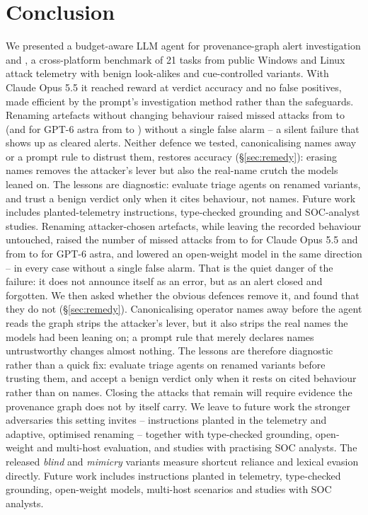 \section{Conclusion}
\label{sec:conclusion}

We presented a budget-aware LLM agent for provenance-graph alert investigation and \bench, a cross-platform
benchmark of 21 tasks from public Windows and Linux attack telemetry with benign look-alikes and cue-controlled
variants.
\ifnum{}
With Claude Opus 5.5 it reached reward \ResFullReward{} at \ResFullAccuracy{} verdict accuracy and no false
positives, made efficient by the prompt's investigation method rather than the safeguards.
\fi
\ifnum{}
\ifconf
Renaming artefacts without changing behaviour raised missed attacks from \ResCueBaseMissed{} to
\ResMimicryMissed{} (and for GPT-6 astra from \McGptBaseMissed{} to \McGptMimicryMissed{}) without a single false
alarm -- a silent failure that shows up as cleared alerts. Neither defence we tested, canonicalising names away or
a prompt rule to distrust them, restores accuracy (\S\ref{sec:remedy}): erasing names removes the attacker's lever
but also the real-name crutch the models leaned on. The lessons are diagnostic: evaluate triage agents on renamed
variants, and trust a benign verdict only when it cites behaviour, not names. Future work includes
planted-telemetry instructions, type-checked grounding and SOC-analyst studies.
\else
Renaming attacker-chosen artefacts, while leaving the recorded behaviour untouched, raised the number of missed
attacks from \ResCueBaseMissed{} to \ResMimicryMissed{} for Claude Opus 5.5 and from \McGptBaseMissed{} to
\McGptMimicryMissed{} for GPT-6 astra, and lowered an open-weight model in the same direction -- in every case
without a single false alarm. That is the quiet danger of the failure: it does not announce itself as an error,
but as an alert closed and forgotten. We then asked whether the obvious defences remove it, and found that they do
not (\S\ref{sec:remedy}). Canonicalising operator names away before the agent reads the graph strips the
attacker's lever, but it also strips the real names the models had been leaning on; a prompt rule that merely
declares names untrustworthy changes almost nothing. The lessons are therefore diagnostic rather than a quick fix:
evaluate triage agents on renamed variants before trusting them, and accept a benign verdict only when it rests on
cited behaviour rather than on names. Closing the attacks that remain will require evidence the provenance graph
does not by itself carry. We leave to future work the stronger adversaries this setting invites -- instructions
planted in the telemetry and adaptive, optimised renaming -- together with type-checked grounding, open-weight and
multi-host evaluation, and studies with practising SOC analysts.
\fi
\else
The released \emph{blind} and \emph{mimicry} variants measure shortcut reliance and lexical evasion
directly. Future work includes instructions planted in telemetry, type-checked grounding, open-weight models,
multi-host scenarios and studies with SOC analysts.
\fi
